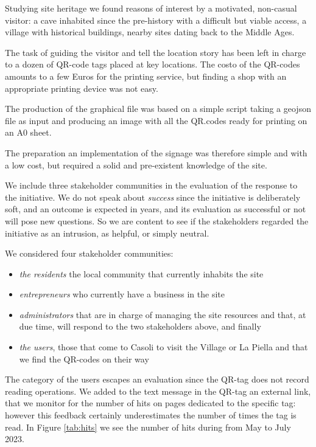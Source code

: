 \documentclass[sustainability,article,submit,pdftex,moreauthors]{Definitions/mdpi}
\begin{document}
Studying site heritage we found reasons of interest by a motivated, non-casual visitor: a cave inhabited since the pre-history with a difficult but viable access, a village with historical buildings, nearby sites dating back to the Middle Ages.

The task of guiding the visitor and tell the location story has been left in charge to a dozen of QR-code tags placed at key locations. The costo of the QR-codes amounts to a few Euros for the printing service, but finding a shop with an appropriate printing device was not easy.

The production of the graphical file was based on a simple script taking a geojson file as input and producing an image with all the QR.codes ready for printing on an A0 sheet.

The preparation an implementation of the signage was therefore simple and with a low cost, but required a solid and pre-existent knowledge of the site.

We include three stakeholder communities in the evaluation of the response to the initiative. We do not speak about {\em success} since the initiative is deliberately soft, and an outcome is expected in years, and its evaluation as successful or not will pose new questions. So we are content to see if the stakeholders regarded the initiative as an intrusion, as helpful, or simply neutral.

We considered four stakeholder communities:

\begin{itemize}
	\item {\em the residents} the local community that currently inhabits the site
	\item {\em entrepreneurs} who currently have a business in the site
	\item {\em administrators} that are in charge of managing the site resources and that, at due time, will respond to the two stakeholders above, and finally
	\item {\em the users}, those that come to Casoli to visit the Village or La Piella and that we find the QR-codes on their way
\end{itemize}

The category of the users escapes an evaluation since the QR-tag does not record reading operations. We added to the text message in the QR-tag an external link, that we monitor for the number of hits on pages dedicated to the specific tag: however this feedback certainly underestimates the number of times the tag is read. In Figure \ref{tab:hits} we see the number of hits during from May to July 2023.  
\end{document}
